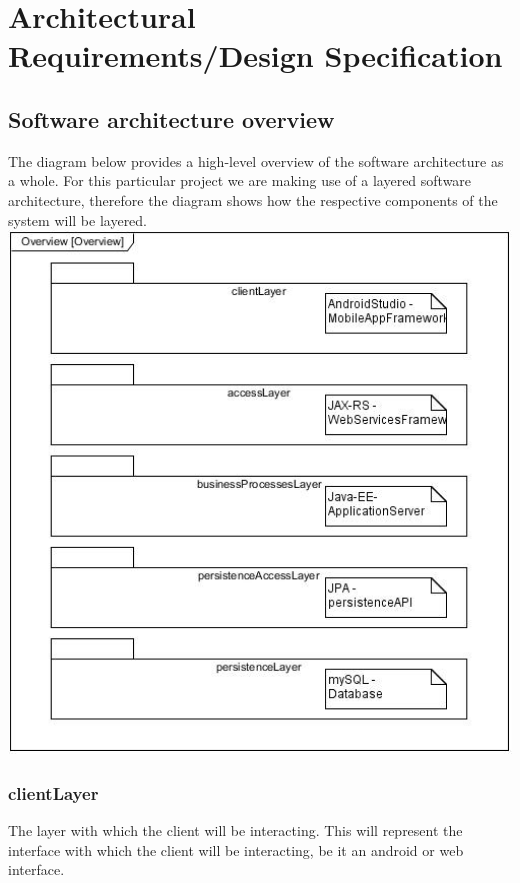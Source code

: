 \documentclass[a4paper,12pt]{article}
\begin{document}
	\newpage
	\section{Architectural Requirements/Design Specification}
	
	\subsection{Software architecture overview}
	
	The diagram below provides a high-level overview of the software architecture as a whole. For this particular project we are making use of a layered software architecture, therefore the diagram shows how the respective components of the system will be layered.\\
	
	\includegraphics[width=1\textwidth]{./Pictures/UML/architectureOverview.jpg}\\[1.5cm]
	
	
	\subsubsection{clientLayer}
	The layer with which the client will be interacting. This will represent the interface with which the client will be interacting, be it an android or web interface.
\end{document}
